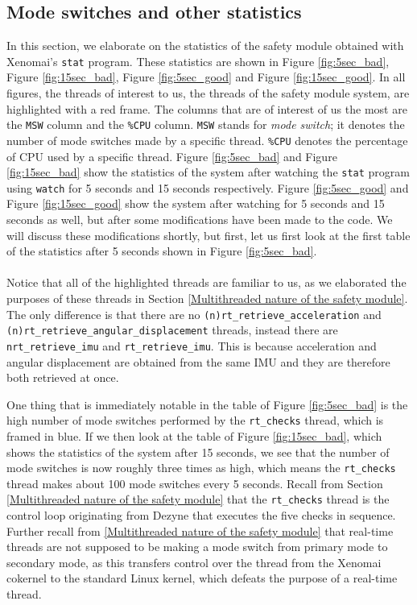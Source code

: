 \documentclass[12pt]{scrreprt}
\begin{document}
\subsection{Mode switches and other statistics}
\label{Mode switches and other statistics}
In this section, we elaborate on the statistics of the safety module obtained with Xenomai's \texttt{stat} program. These statistics are shown in Figure \ref{fig:5sec_bad}, Figure \ref{fig:15sec_bad}, Figure \ref{fig:5sec_good} and Figure \ref{fig:15sec_good}. In all figures, the threads of interest to us, the threads of the safety module system, are highlighted with a red frame. The columns that are of interest of us the most are the \texttt{MSW} column and the \texttt{\%CPU} column. \texttt{MSW} stands for \textit{mode switch}; it denotes the number of mode switches made by a specific thread. \texttt{\%CPU} denotes the percentage of CPU used by a specific thread. Figure \ref{fig:5sec_bad} and Figure \ref{fig:15sec_bad} show the statistics of the system after watching the \texttt{stat} program using \texttt{watch} for 5 seconds and 15 seconds respectively. Figure \ref{fig:5sec_good} and Figure \ref{fig:15sec_good} show the system after watching for 5 seconds and 15 seconds as well, but after some modifications have been made to the code. We will discuss these modifications shortly, but first, let us first look at the first table of the statistics after 5 seconds shown in Figure \ref{fig:5sec_bad}.
\\\\
Notice that all of the highlighted threads are familiar to us, as we elaborated the purposes of these threads in Section \ref{Multithreaded nature of the safety module}. The only difference is that there are no \texttt{(n)rt\_retrieve\_acceleration} and \texttt{(n)rt\_retrieve\_angular\_displacement} threads, instead there are \texttt{nrt\_retrieve\_imu} and \texttt{rt\_retrieve\_imu}. This is because acceleration and angular displacement are obtained from the same IMU and they are therefore both retrieved at once.
\par
One thing that is immediately notable in the table of Figure \ref{fig:5sec_bad} is the high number of mode switches performed by the \texttt{rt\_checks} thread, which is framed in blue. If we then look at the table of Figure \ref{fig:15sec_bad}, which shows the statistics of the system after 15 seconds, we see that the number of mode switches is now roughly three times as high, which means the \texttt{rt\_checks} thread makes about 100 mode switches every 5 seconds. Recall from Section \ref{Multithreaded nature of the safety module} that the \texttt{rt\_checks} thread is the control loop originating from Dezyne that executes the five checks in sequence. Further recall from \ref{Multithreaded nature of the safety module} that real-time threads are not supposed to be making a mode switch from primary mode to secondary mode, as this transfers control over the thread from the Xenomai cokernel to the standard Linux kernel, which defeats the purpose of a real-time thread.
\end{document}
